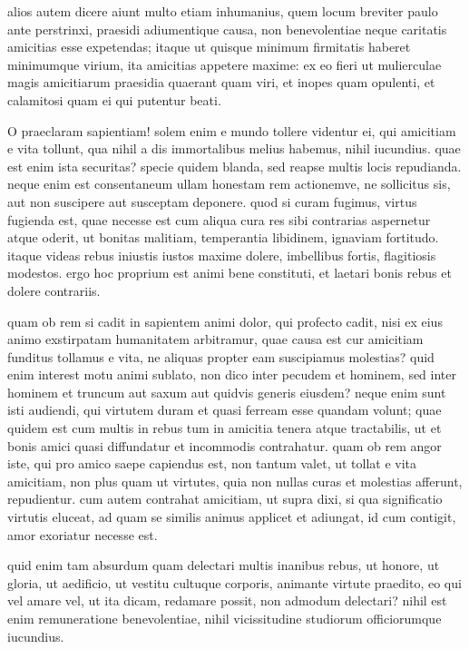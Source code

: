  alios autem dicere aiunt multo etiam inhumanius, quem locum breviter paulo ante perstrinxi, praesidi adiumentique causa, non benevolentiae neque caritatis amicitias esse expetendas; itaque ut quisque minimum firmitatis haberet minimumque virium, ita amicitias appetere maxime: ex eo fieri ut mulierculae magis amicitiarum praesidia quaerant quam viri, et inopes quam opulenti, et calamitosi quam ei qui putentur beati.

 O praeclaram sapientiam! solem enim e mundo tollere videntur ei, qui amicitiam e vita tollunt, qua nihil a dis immortalibus melius habemus, nihil iucundius. quae est enim ista securitas? specie quidem blanda, sed reapse multis locis repudianda. neque enim est consentaneum ullam honestam rem actionemve, ne sollicitus sis, aut non suscipere aut susceptam deponere. quod si curam fugimus, virtus fugienda est, quae necesse est cum aliqua cura res sibi contrarias aspernetur atque oderit, ut bonitas malitiam, temperantia libidinem, ignaviam fortitudo. itaque videas rebus iniustis iustos maxime dolere, imbellibus fortis, flagitiosis modestos. ergo hoc proprium est animi bene constituti, et laetari bonis rebus et dolere contrariis.

 quam ob rem si cadit in sapientem animi dolor, qui profecto cadit, nisi ex eius animo exstirpatam humanitatem arbitramur, quae causa est cur amicitiam funditus tollamus e vita, ne aliquas propter eam suscipiamus molestias? quid enim interest motu animi sublato, non dico inter pecudem et hominem, sed inter hominem et truncum aut saxum aut quidvis generis eiusdem? neque enim sunt isti audiendi, qui virtutem duram et quasi ferream esse quandam volunt; quae quidem est cum multis in rebus tum in amicitia tenera atque tractabilis, ut et bonis amici quasi diffundatur et incommodis contrahatur. quam ob rem angor iste, qui pro amico saepe capiendus est, non tantum valet, ut tollat e vita amicitiam, non plus quam ut virtutes, quia non nullas curas et molestias afferunt, repudientur. cum autem contrahat amicitiam, ut supra dixi, si qua significatio virtutis eluceat, ad quam se similis animus applicet et adiungat, id cum contigit, amor exoriatur necesse est.

 quid enim tam absurdum quam delectari multis inanibus rebus, ut honore, ut gloria, ut aedificio, ut vestitu cultuque corporis, animante virtute praedito, eo qui vel amare vel, ut ita dicam, redamare possit, non admodum delectari? nihil est enim remuneratione benevolentiae, nihil vicissitudine studiorum officiorumque iucundius.

